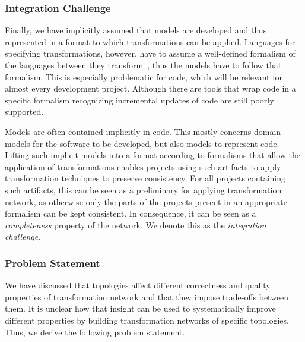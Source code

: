 \begin{integrationcontribution}

\subsubsection*{Integration Challenge}

Finally, we have implicitly assumed that models are developed and thus represented in a format to which transformations can be applied.
Languages for specifying transformations, however, have to assume a well-defined formalism of the languages between they transform~\cite{klare2017models}, thus the models have to follow that formalism.
This is especially problematic for code, which will be relevant for almost every development project.
Although there are tools that wrap code in a specific formalism %
recognizing incremental updates of code are still poorly supported.

Models are often contained implicitly in code.
This mostly concerns domain models for the software to be developed, but also models to represent code. %
Lifting such implicit models into a format according to formalisms that allow the application of transformations %
enables projects using such artifacts to apply transformation techniques to preserve consistency.
For all projects containing such artifacts, this can be seen as a preliminary for applying transformation network, as otherwise only the parts of the projects present in an appropriate formalism can be kept consistent.
In consequence, it can be seen as a \emph{completeness} property of the network.
We denote this as the \emph{integration challenge}.

\end{integrationcontribution}


\subsubsection*{Problem Statement}

We have discussed that topologies affect different correctness and quality properties of transformation network and that they impose trade-offs between them.
It is unclear how that insight can be used to systematically improve different properties by building transformation networks of specific topologies.
Thus, we derive the following problem statement.

